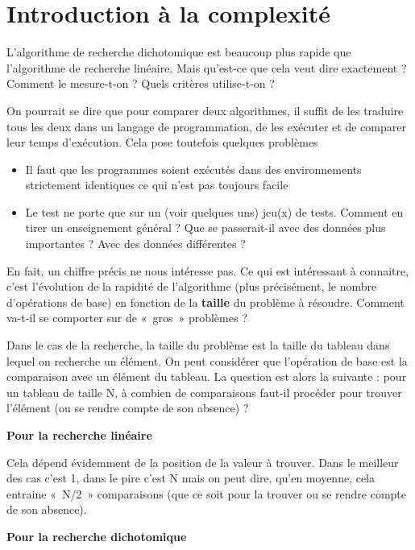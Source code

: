 	
	\section{Introduction à la complexité}

		L’algorithme de recherche dichotomique est beaucoup plus rapide que
		l’algorithme de recherche linéaire. Mais qu’est-ce que cela veut dire
		exactement ? Comment le mesure-t-on ? Quels critères utilise-t-on ?

		On pourrait se dire que pour comparer deux algorithmes, il suffit de les
		traduire tous les deux dans un langage de programmation, de les
		exécuter et de comparer leur temps d’exécution. Cela pose toutefois
		quelques problèmes
				
		\liststyleListv
		\begin{itemize}
			\item 
				Il faut que les programmes soient exécutés dans des environnements
				strictement identiques ce qui n’est pas toujours facile
			\item 
				Le test ne porte que sur un (voir quelques uns) jeu(x) de tests. Comment
				en tirer un enseignement général ? Que se passerait-il avec des données
				plus importantes ? Avec des données différentes ?
		\end{itemize}
		
		En fait, un chiffre précis ne nous intéresse pas. Ce qui est intéressant
		à connaitre, c’est l’évolution de la rapidité de l’algorithme (plus
		précisément, le nombre d’opérations de base) en fonction de la
		\textbf{taille} du problème à résoudre. Comment va-t-il se comporter
		sur de «~gros~» problèmes ?

		Dans le cas de la recherche, la taille du problème est la taille du
		tableau dans lequel on recherche un élément. On peut considérer que
		l’opération de base est la comparaison avec un élément du tableau. La
		question est alors la suivante : pour un tableau de taille N, à combien
		de comparaisons faut-il procéder pour trouver l’élément (ou se rendre
		compte de son absence) ?

		{\bfseries
		Pour la recherche linéaire}

			Cela dépend évidemment de la position de la valeur à trouver. Dans le
			meilleur des cas c’est 1, dans le pire c’est N mais on peut dire, qu’en
			moyenne, cela entraine «~N/2~» comparaisons (que ce soit pour la
			trouver ou se rendre compte de son absence).

		{\bfseries
		Pour la recherche dichotomique}


